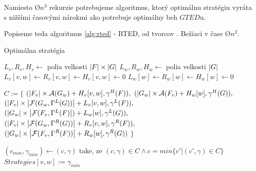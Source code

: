 Namiesto \O{$n^3$} rekurzie potrebujeme algoritmus, ktorý optimálnu stratégiu vyráta
s nižšími časovými nárokmi ako potrebuje optimálny beh $GTED$u.

Popiseme teda algoritmus \ref{alg:rted} - RTED, od tvorcov \citet{RTED}.
Bežiaci v čase \O{$n^2$}.

\begin{algorithm}
  \caption{Optimálna stratégia}
  \label{alg:rted}
  \begin{algorithmic}[1]
      \State $L_{v}, R_{v}, H_{v} \gets$ polia velkosti $\left|{F}\right| \times \left|{G}\right|$
      \State $L_{w}, R_{w}, H_{w} \gets$ polia velkosti $\left|{G}\right|$
            \State $L_{v}[v, w] \gets R_{v}[v, w] \gets H_{v}[v, w] \gets 0$
          \EndIf
            \State $L_{w}[w] \gets R_{w}[w] \gets  H_{w}[w] \gets 0$
          \EndIf

          \State $C := \{$
            \Indent
              \State $(\left|{F_{v}}\right| \times \mathcal{A}(G_{w}) +
                H_{v}[v, w], \gamma^{H}(F)),$
              \State $(\left|{G_{w}}\right| \times \mathcal{A}(F_{v}) +
                H_{w}[w], \gamma^{H}(G)),$
              \State $(\left|{F_{v}}\right| \times
                \left|{\mathcal{F}(G_{w}, \Gamma^{L}(G))}\right| +
                L_{v}[v, w], \gamma^{L}(F)),$
              \State $(\left|{G_{w}}\right| \times
                \left|{\mathcal{F}(F_{v}, \Gamma^{L}(F)}\right|) +
                L_{w}[w], \gamma^{L}(G)),$
              \State $(\left|{F_{v}}\right| \times
                \left|{\mathcal{F}(G_{w}, \Gamma^{R}(G))}\right| +
                R_{v}[v, w], \gamma^{R}(F)),$
              \State $(\left|{G_{w}}\right| \times
                \left|{\mathcal{F}(F_{v}, \Gamma^{R}(F))}\right| +
                R_{w}[w], \gamma^{R}(G))$
              \State $\}$
            \EndIndent

            \State $(c_{min}, \gamma_{min}) \gets (c, \gamma)$ take, ze
              $(c, \gamma) \in C \wedge c = min\{c' | (c', \gamma) \in C\}$
            \State $Strategies[v, w] := \gamma_{min}$

            \State {}
              \State {}
              \State {}
            \EndIf
              \State {}
              \State {}
              \State {}
            \EndIf
        \EndFor
      \EndFor
      \State {}
    \EndProcedure


\end{algorithmic}
\end{algorithm}
